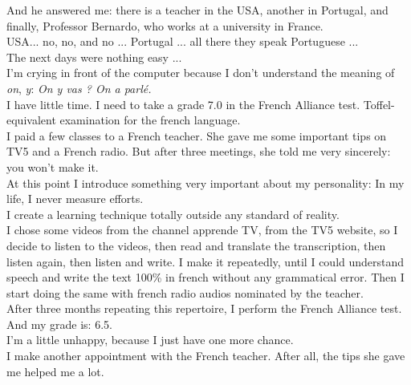 \documentclass[11pt]{book}
\begin{document}
\noindent And he answered me: there is a teacher in the USA, another in Portugal, and finally, Professor Bernardo, who works at a university in France. \\

\noindent USA... no, no, and no ... Portugal ... all there they speak Portuguese ... \\

\noindent The next days were nothing easy ... \\

\noindent I'm crying in front of the computer because I don't understand the meaning of \emph{on}, \emph{y}: \emph{On y vas ? On a parlé.}  \\

\noindent I have little time. I need to take a grade 7.0 in the French Alliance test. Toffel-equivalent examination for the french language. \\

\noindent I paid a few classes to a French teacher. She gave me some important tips on TV5 and a French radio. But after three meetings, she told me very sincerely: you won't make it. \\

\noindent At this point I introduce something very important about my personality: In my life, I never measure efforts. \\

\noindent I create a learning technique totally outside any standard of reality. \\

\noindent I chose some videos from the channel apprende TV, from the TV5 website, so I decide to listen to the videos, then read and translate the transcription, then listen again, then listen and write. I make it repeatedly, until I could understand speech and write the  text 100\% in french without any grammatical error. Then I start doing the same with french radio audios nominated by the teacher. \\

\noindent After three months repeating this repertoire, I perform the French Alliance test. And my grade is: 6.5. \\

\noindent I'm a little unhappy, because I just have one more chance.  \\

\noindent I make another appointment with the French teacher. After all, the tips she gave me helped me a lot. \\
\end{document}
